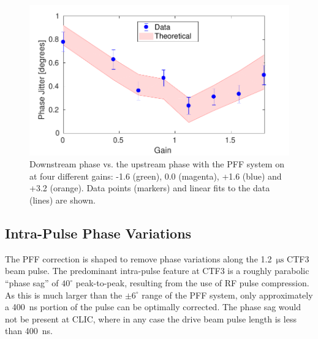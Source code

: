 \documentclass[%
 reprint,
superscriptaddress,
 amsmath,amssymb,
 prl,
]{revtex4-1}
\begin{document}
\begin{figure}
\includegraphics[width=\columnwidth]{figs/gScan}%
\caption{\label{fig:gScan}Downstream phase vs. the upstream phase with the PFF 
system on at four different gains: -1.6 (green), 0.0 (magenta), +1.6 (blue) and 
+3.2 (orange). Data points (markers) and linear fits to the data (lines) are 
shown.}
\end{figure}

\subsection{\label{ss:shape}Intra-Pulse Phase Variations}

The PFF correction is shaped to remove phase variations along the 
1.2~\(\mathrm{\mu s}\) CTF3 beam pulse. The predominant intra-pulse feature at 
CTF3
is a roughly parabolic ``phase sag'' of \(40^\circ\) peak-to-peak, resulting 
from the use of RF pulse compression. As this is much larger than the 
\(\pm 6^\circ\) range of the PFF system, only approximately a 400~ns portion of 
the pulse can be optimally corrected. The phase sag would not be present at 
CLIC, where in any case the drive beam pulse length is less than 400~ns.


\end{document}
